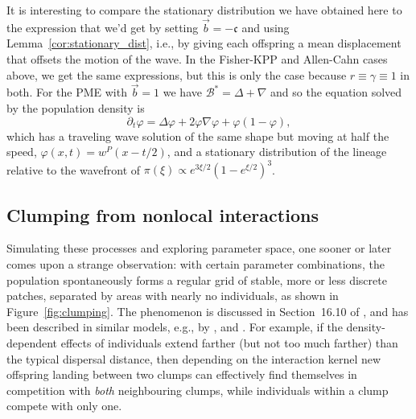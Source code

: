 \documentclass[12pt]{article}
\newcommand{\grad}{\nabla}
\newcommand{\DG}{\mathcal{B}}  %
\newcommand{\meanq}{\vec b}    %
\newcommand{\wavespeed}{\mathfrak{c}}    %
\newcommand{\Lgen}{\mathcal{L}}    %
\newcommand{\comment}[1]{{\color{blue} \it #1}}
\numberwithin{equation}{section}
\begin{document}
It is interesting to compare the stationary distribution we have obtained here
to the expression that we'd get by setting $\meanq = -\wavespeed$
and using Lemma~\ref{cor:stationary_dist},
i.e., by giving each offspring a mean displacement that offsets the motion of the wave.
In the Fisher-KPP and Allen-Cahn cases above, we get the same expressions,
but this is only the case because $r\equiv\gamma\equiv1$ in both.
For the PME with $\meanq = 1$ we have $\DG^* = \Delta + \grad$ 
and so the equation solved by the population density is
$$
    \partial_t \varphi = \Delta \varphi + 2 \varphi \grad \varphi + \varphi (1 - \varphi) ,
$$
which has a traveling wave solution of the same shape but moving at half the speed,
$\varphi(x,t) = w^{P}(x-t/2)$,
and a stationary distribution of the lineage relative to the wavefront of
$\pi(\xi) \propto e^{3\xi/2} (1 - e^{\xi/2})^3$.



\subsection{Clumping from nonlocal interactions}

Simulating these processes and exploring parameter space,
one sooner or later comes upon a strange observation:
with certain parameter combinations, the population spontaneously forms a regular grid
of stable, more or less discrete patches, separated by areas with nearly no individuals,
as shown in Figure~\ref{fig:clumping}.
The phenomenon is discussed in Section~16.10 of \citet{haller2022evolutionary},
and has been described in similar models, e.g.,
by \citet{britton1990spatial,sasaki1997clumped,hernandezgarcia2004clustering,young2001reproductive}, and \citet{berestycki2009nonlocal}.
For example, if the density-dependent effects of individuals extend farther (but not too much farther)
than the typical dispersal distance,
then depending on the interaction kernel
new offspring landing between two clumps
can effectively find themselves in competition with 
\emph{both} neighbouring clumps,
while individuals within a clump compete with only one.
\end{document}
